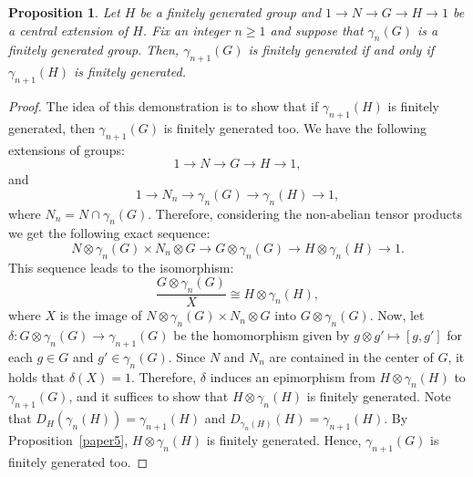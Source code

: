 \documentclass[10pt,a4paper]{amsart}
\newtheorem{proposition}{Proposition}
\def\de{\delta}
\begin{document}
\begin{proposition} \label{prop3}
Let $H$ be a finitely generated group and $1\to N \to G \to H \to 1$ be a central extension of $H$. Fix an integer $n\geq 1$ and suppose that $\gamma_n(G)$ is a finitely
generated group. Then, $\gamma_{n+1}(G)$ is finitely generated if and only if $\gamma_{n+1}(H)$ is finitely generated.
\end{proposition}

\begin{proof} The idea of this demonstration is to show that if  $\gamma_{n+1}(H)$ is finitely generated, then $\gamma_{n+1}(G)$ is finitely generated too. We have the following extensions
of groups:
\[
1\to N \to G \to H \to 1 ,
\]
and
\[
1\to N_n \to \gamma_n(G) \to \gamma_n(H) \to 1,
\]
where $N_n = N\cap \gamma_n(G)$. Therefore, considering the non-abelian tensor products we get the following exact sequence:
\[
N\otimes \gamma_n(G) \times N_n\otimes G \to G\otimes \gamma_n(G) \to H\otimes \gamma_n(H) \to 1 .
\]
This sequence leads to the isomorphism:
\[
\frac{ G\otimes \gamma_n(G)}{X} \cong  H\otimes \gamma_n(H),
\]
where $X$ is the image of $N\otimes \gamma_n(G) \times N_n\otimes G$ into $G\otimes \gamma_n(G)$. Now, let
$\de \colon G\otimes \gamma_n(G)\to \gamma_{n+1}(G)$ be the homomorphism given by $g\otimes g' \mapsto [g, g']$ for
each $g\in G$ and $g' \in \gamma_{n}(G)$. Since $N$ and $N_n$ are contained in the center of $G$, it holds that $\de (X)=1$. Therefore, $\de$ induces an epimorphism
from $ H\otimes \gamma_n(H)$ to $\gamma_{n+1}(G)$, and it suffices to show that $H\otimes \gamma_n (H)$ is finitely generated. Note that
$D_{H}(\gamma_n(H))=\gamma_{n+1}(H)$ and $D_{\gamma_n (H)}(H)=\gamma_{n+1}(H)$. By Proposition~\ref{paper5}, $H\otimes \gamma_n (H)$ is
finitely generated. Hence, $\gamma_{n+1}(G)$ is finitely generated too.
\end{proof}
\end{document}
